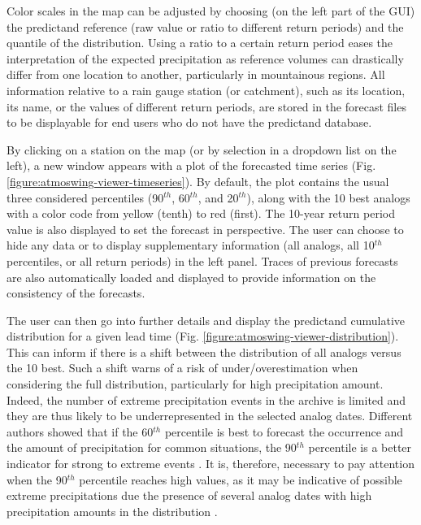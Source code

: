 \documentclass[review]{elsarticle}
\begin{document}
Color scales in the map can be adjusted by choosing (on the left part of the GUI) the predictand reference (raw value or ratio to different return periods) and the quantile of the distribution. Using a ratio to a certain return period eases the interpretation of the expected precipitation as reference volumes can drastically differ from one location to another, particularly in mountainous regions. All information relative to a rain gauge station (or catchment), such as its location, its name, or the values of different return periods, are stored in the forecast files to be displayable for end users who do not have the predictand database.

By clicking on a station on the map (or by selection in a dropdown list on the left), a new window appears with a plot of the forecasted time series (Fig. \ref{figure:atmoswing-viewer-timeseries}). By default, the plot contains the usual three considered percentiles (90$^{th}$, 60$^{th}$, and 20$^{th}$), along with the 10 best analogs with a color code from yellow (tenth) to red (first). The 10-year return period value is also displayed to set the forecast in perspective. The user can choose to hide any data or to display supplementary information (all analogs, all 10$^{th}$ percentiles, or all return periods) in the left panel. Traces of previous forecasts are also automatically loaded and displayed to provide information on the consistency of the forecasts. 

The user can then go into further details and display the predictand cumulative distribution for a given lead time (Fig. \ref{figure:atmoswing-viewer-distribution}). This can inform if there is a shift between the distribution of all analogs versus the 10 best. Such a shift warns of a risk of under/overestimation when considering the full distribution, particularly for high precipitation amount. Indeed, the number of extreme precipitation events in the archive is limited and they are thus likely to be underrepresented in the selected analog dates. Different authors showed that if the 60$^{th}$ percentile is best to forecast the occurrence and the amount of precipitation for common situations, the 90$^{th}$ percentile is a better indicator for strong to extreme events \citep{Djerboua2001, Bontron2004, Marty2010}. It is, therefore, necessary to pay attention when the 90$^{th}$ percentile reaches high values, as it may be indicative of possible extreme precipitations due the presence of several analog dates with high precipitation amounts in the distribution \citep{Djerboua2001}.
\end{document}
